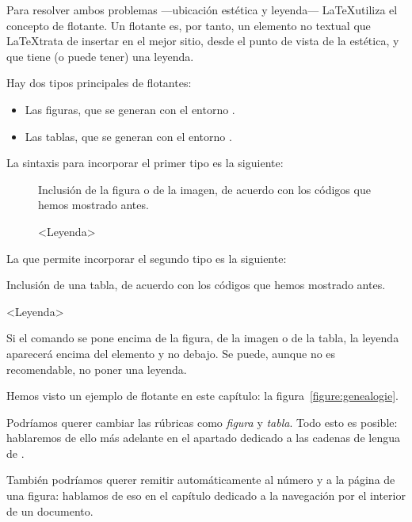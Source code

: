 Para resolver ambos problemas ---ubicación estética y leyenda--- \LaTeX utiliza el concepto de flotante. Un flotante es, por tanto, un elemento no textual que \LaTeX trata de insertar en el mejor sitio, desde el punto de vista de la estética, y que tiene (o puede tener) una leyenda.

Hay dos tipos principales de flotantes:
\begin{itemize}
    \item Las figuras, que se generan con el entorno .
    \item Las tablas, que se generan con el entorno .
\end{itemize}

La sintaxis para incorporar el primer tipo es la siguiente:

\begin{latexcode}
\begin{figure}[<parámetro de ubicación>]
    Inclusión de la figura o de la imagen,
    de acuerdo con los códigos que hemos mostrado antes.
    \caption{<Leyenda>}
\end{figure} 
\end{latexcode}

La que permite incorporar el segundo tipo es la siguiente:

\begin{latexcode}
\begin{table}[<parámetro de ubicación>]
    Inclusión de una tabla, de acuerdo con los códigos que hemos mostrado antes.
    \caption{<Leyenda>}
\end{table} 
\end{latexcode}

Si el comando  se pone encima de la figura, de la imagen o de la tabla, la leyenda aparecerá encima del elemento y no debajo. Se puede, aunque no es recomendable, no poner una leyenda.

Hemos visto un ejemplo de flotante en este capítulo: la figura~\ref{figure:genealogie}.
\begin{attention}
    Podríamos querer cambiar las rúbricas como \emph{figura} y \emph{tabla}. Todo esto es posible: hablaremos de ello más adelante en el apartado dedicado a las cadenas de lengua de  .
    
    También podríamos querer remitir automáticamente al número y a la página de una figura: hablamos de eso en el capítulo dedicado a la navegación por el interior de un documento.
\end{attention}

